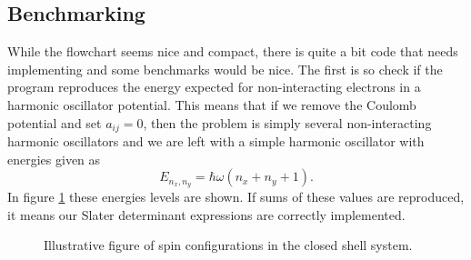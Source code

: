 \documentclass[english, a4paper]{article}
\newcommand\lr[1]{\left(#1\right)}
\begin{document}
	\subsection{Benchmarking}
	While the flowchart seems nice and compact, there is quite a bit code that needs implementing and some benchmarks would be nice. The first is so check if the program reproduces the energy expected for non-interacting electrons in a harmonic oscillator potential. This means that if we remove the Coulomb potential and set $a_{ij} = 0$, then the problem is simply several non-interacting harmonic oscillators and we are left with a simple harmonic oscillator with energies given as
	\begin{equation}
	E_{n_x,n_y} = \hbar\omega\lr{n_x + n_y +1}.
	\end{equation}
	In figure \ref{fig: spinFig} these energies levels are shown. If sums of these values are reproduced, it means our Slater determinant expressions are correctly implemented.
		
		
		\begin{figure}[H]
			\begin{center}
			\end{center}
			\caption{Illustrative figure of spin configurations in the closed shell system.}
			\label{fig: spinFig}
		\end{figure}
	
\end{document}
